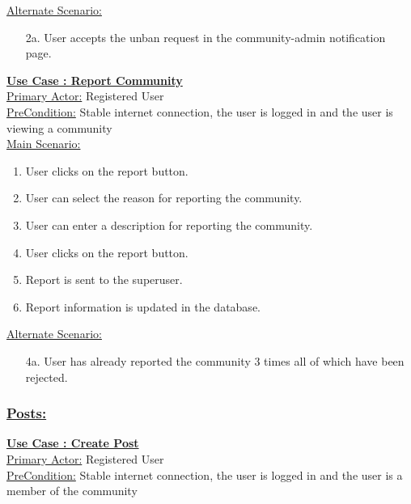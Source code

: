 \documentclass[conference,compsoc]{IEEEtran}
\newcounter{UC}
\newcommand{\nextU}{\stepcounter{UC}\theUC}
\begin{document}
\underline{Alternate Scenario:}\\
\begin{enumerate}
    \item [2a.] User accepts the unban request in the community-admin notification page.
\end{enumerate}\vspace{0.2cm}

\underline{\textbf{Use Case \nextU: Report Community}}\\

\underline{Primary Actor:} Registered User\\

\underline{PreCondition:} Stable internet connection, the user is logged in and the user is viewing a community\\

\underline{Main Scenario:}\\
\begin{enumerate}
    \item User clicks on the report button.
    \item User can select the reason for reporting the community.
    \item User can enter a description for reporting the community.
    \item User clicks on the report button.
    \item Report is sent to the superuser.
    \item Report information is updated in the database.
\end{enumerate}

\underline{Alternate Scenario:}\\
\begin{enumerate}
    \item [4a.] User has already reported the community 3 times all of which have been rejected.
\end{enumerate}\vspace{0.2cm}


\subsubsection{\underline{Posts:}}

\underline{\textbf{Use Case \nextU: Create Post}}\\

\underline{Primary Actor:} Registered User\\

\underline{PreCondition:} Stable internet connection, the user is logged in and the user is a member of the community\\
\end{document}
